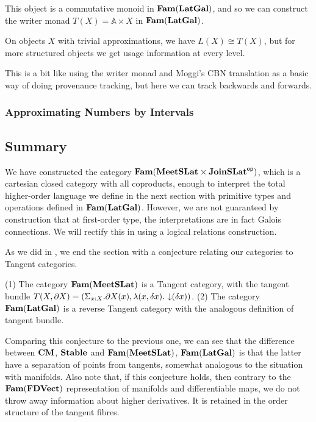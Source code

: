 This object is a commutative monoid in $\mathbf{Fam}(\mathbf{LatGal})$, and so we can
construct the writer monad $T(X) = \mathbb{A} \times X$ in
$\mathbf{Fam}(\mathbf{LatGal})$.

On objects $X$ with trivial approximations, we have $L(X) \cong T(X)$,
but for more structured objects we get usage information at every level.

This is a bit like using the writer monad and Moggi's CBN translation
as a basic way of doing provenance tracking, but here we can track
backwards and forwards.

\subsubsection{Approximating Numbers by Intervals}


\subsection{Summary}

We have constructed the category
$\mathbf{Fam}(\mathbf{MeetSLat} \times \mathbf{JoinSLat}^{\mathsf{op}})$, which is a cartesian closed
category with all coproducts, enough to interpret the total
higher-order language we define in the next section with primitive
types and operations defined in $\mathbf{Fam}(\mathbf{LatGal})$. However, we are not
guaranteed by construction that at first-order type, the
interpretations are in fact Galois connections. We will rectify this
in  using a logical relations construction.

As we did in , we end the section with a
conjecture relating our categories to Tangent categories.

\begin{conjecture}
  (1) The category $\mathbf{Fam}(\mathbf{MeetSLat})$ is a Tangent category, with the
  tangent bundle
  $T(X, \partial X) = (\Sigma_{x : X}. \partial X(x), \lambda (x,
  \delta x).\, \mathop{\downarrow}(\delta x))$. (2) The category $\mathbf{Fam}(\mathbf{LatGal})$
  is a reverse Tangent category with the analogous definition of
  tangent bundle.
\end{conjecture}

Comparing this conjecture to the previous one, we can see that the
difference between $\mathbf{CM}$, $\mathbf{Stable}$ and $\mathbf{Fam}(\mathbf{MeetSLat})$,
$\mathbf{Fam}(\mathbf{LatGal})$ is that the latter have a separation of points from
tangents, somewhat analogous to the situation with manifolds. Also
note that, if this conjecture holds, then contrary to the $\mathbf{Fam}(\mathbf{FDVect})$ representation of
manifolds and differentiable maps, we do
not throw away information about higher derivatives. It is retained in
the order structure of the tangent fibres.
